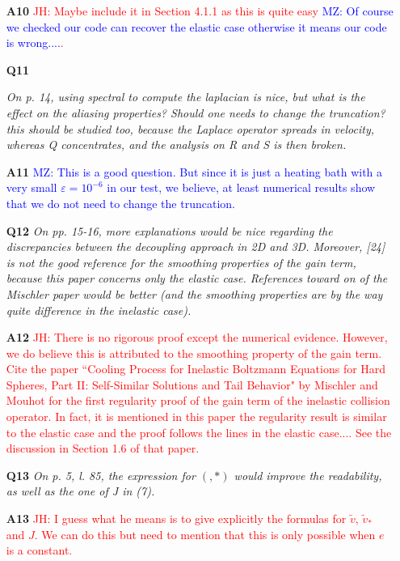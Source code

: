 \documentclass[11pt]{article}
\newcommand{\jh}[1]{\textcolor{red}{JH: #1}}
\newcommand{\mz}[1]{\textcolor{blue}{MZ: #1}}
\begin{document}
\begin{itemize}
\item[{\bf A10}] \jh{Maybe include it in Section 4.1.1 as this is quite easy \mz{Of course we checked our code can recover the elastic case otherwise it means our code is wrong....}.}


\item[{\bf Q11}] {\it On p. 14, using spectral to compute the laplacian is nice, but what is the effect on the aliasing properties? Should one needs to change the truncation? this should be studied too, because the Laplace operator spreads in velocity, whereas Q concentrates, and the analysis on R and S is then broken.

}

\item[{\bf A11}] \mz{This is a good question. But since it is just a heating bath with a very small $\varepsilon = 10^{-6}$ in our test, we believe, at least numerical results show that we do not need to change the truncation.}


\item[{\bf Q12}] {\it On pp. 15-16, more explanations would be nice regarding the discrepancies between the decoupling approach in 2D and 3D. Moreover, [24] is not the good reference for the smoothing properties of the gain term, because this paper concerns only the elastic case. References toward on of the Mischler paper would be better (and the smoothing properties are by the way quite difference in the inelastic case).
}

\item[{\bf A12}] \jh{There is no rigorous proof except the numerical evidence. However, we do believe this is attributed to the smoothing property of the gain term. Cite the paper ``Cooling Process for Inelastic Boltzmann Equations for Hard Spheres, Part II: Self-Similar Solutions and Tail Behavior" by Mischler and Mouhot for the first regularity proof of the gain term of the inelastic collision operator. In fact, it is mentioned in this paper the regularity result is similar to the elastic case and the proof follows the lines in the elastic case.... See the discussion in Section 1.6 of that paper.}


\item[{\bf Q13}] {\it On p. 5, l. 85, the expression for $(,*)$ would improve the readability, as well as the one of J in (7).}

\item[{\bf A13}] \jh{I guess what he means is to give explicitly the formulas for $\tilde{v}$, $\tilde{v}_*$ and $J$. We can do this but need to mention that this is only possible when $e$ is a constant.}



\end{itemize}
\end{document}
